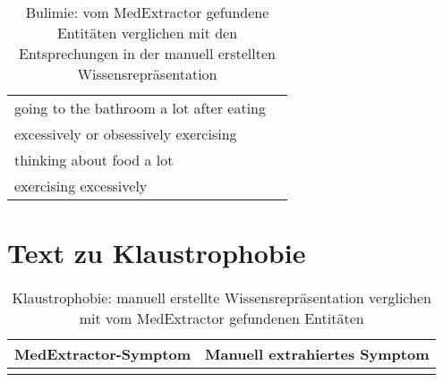 \begin{table}[H]
\begin{center}
\begin{tabular}{ll}
          going to the bathroom a lot after eating &                \\
             excessively or obsessively exercising &                \\
                         thinking about food a lot &                \\
                            exercising excessively &                \\
\bottomrule
\end{tabular}
\caption{Bulimie: vom MedExtractor gefundene Entitäten verglichen mit den Entsprechungen in der manuell erstellten Wissensrepräsentation}
\label{tab:bulimia_medextractor_manuell}
\end{center}
\end{table}


\section{Text zu Klaustrophobie}
\label{sec:claustrophobia} 

\begin{table}[H]
\begin{center}
\begin{tabular}{ll}
\toprule
  MedExtractor-Symptom &                       Manuell extrahiertes Symptom \\
\midrule
                &                                                \\

\bottomrule
\end{tabular}
\caption{Klaustrophobie: manuell erstellte Wissensrepräsentation verglichen mit vom MedExtractor gefundenen Entitäten}
\label{tab:claustrophobia_vergleich_manuell_medextractor}
\end{center}
\end{table}


